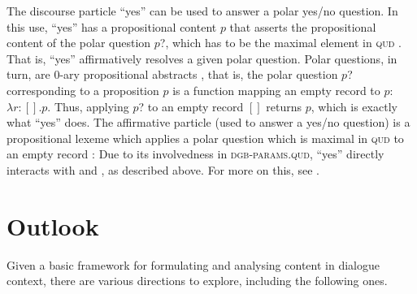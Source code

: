 \documentclass[output=paper
 	        ,biblatex
                ,babelshorthands
                ,newtxmath
                ,draftmode
                ,colorlinks, citecolor=brown
]{langscibook}
\begin{document}
The discourse particle \enquote{yes} can be used to answer a polar yes/no question.
%
In this use, \enquote{yes} has a propositional content $p$ that asserts the propositional content of the polar question $p$?, which has to be the maximal element in \textsc{qud} \citep[Chapter~2,  \textit{et seq.}]{Ginzburg:2012}.
%
That is, \enquote{yes} affirmatively resolves a given polar question.
%
Polar questions, in turn, are 0-ary propositional abstracts \citep[]{Ginzburg:2012}, that is, the polar question $p$? corresponding to a proposition $p$ is a function mapping an empty record to $p$: $\lambda r : [] . p$.
%
Thus, applying $p$? to an empty record $[]$ returns $p$, which is exactly what \enquote{yes} does.
%
The affirmative particle (used to answer a yes/no question) is a propositional lexeme which applies a polar question which is maximal in \textsc{qud} to an empty record \citep[cf.][]{Ginzburg:2012}:
%
\ea
\z 
%
Due to its involvedness in \textsc{dgb-params.qud}, \enquote{yes} directly interacts with  and , as described above.
%
For more on this, see \citet{Ginzburg:2012}.



\section{Outlook}
\label{sec:outlook-dialogue}

Given a basic framework for formulating and analysing content in dialogue context, there are various directions to explore, including the following ones.
\end{document}
